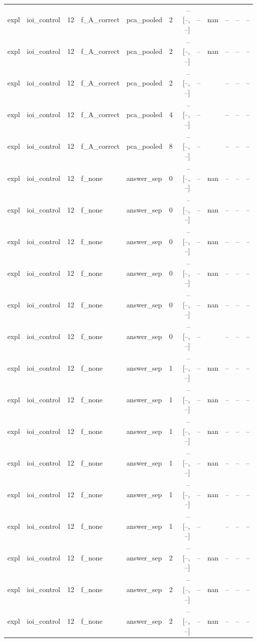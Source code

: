 \begin{tabular}{llrllrrrlrrr}
expl & ioi\_control & 12 & f\_A\_correct & pca\_pooled & 2 & -- [--, --] & -- & nan & -- & -- & -- \\
expl & ioi\_control & 12 & f\_A\_correct & pca\_pooled & 2 & -- [--, --] & -- & nan & -- & -- & -- \\
expl & ioi\_control & 12 & f\_A\_correct & pca\_pooled & 2 & -- [--, --] & -- &  & -- & -- & -- \\
expl & ioi\_control & 12 & f\_A\_correct & pca\_pooled & 4 & -- [--, --] & -- &  & -- & -- & -- \\
expl & ioi\_control & 12 & f\_A\_correct & pca\_pooled & 8 & -- [--, --] & -- &  & -- & -- & -- \\
expl & ioi\_control & 12 & f\_none & answer\_sep & 0 & -- [--, --] & -- & nan & -- & -- & -- \\
expl & ioi\_control & 12 & f\_none & answer\_sep & 0 & -- [--, --] & -- & nan & -- & -- & -- \\
expl & ioi\_control & 12 & f\_none & answer\_sep & 0 & -- [--, --] & -- & nan & -- & -- & -- \\
expl & ioi\_control & 12 & f\_none & answer\_sep & 0 & -- [--, --] & -- & nan & -- & -- & -- \\
expl & ioi\_control & 12 & f\_none & answer\_sep & 0 & -- [--, --] & -- & nan & -- & -- & -- \\
expl & ioi\_control & 12 & f\_none & answer\_sep & 0 & -- [--, --] & -- &  & -- & -- & -- \\
expl & ioi\_control & 12 & f\_none & answer\_sep & 1 & -- [--, --] & -- & nan & -- & -- & -- \\
expl & ioi\_control & 12 & f\_none & answer\_sep & 1 & -- [--, --] & -- & nan & -- & -- & -- \\
expl & ioi\_control & 12 & f\_none & answer\_sep & 1 & -- [--, --] & -- & nan & -- & -- & -- \\
expl & ioi\_control & 12 & f\_none & answer\_sep & 1 & -- [--, --] & -- & nan & -- & -- & -- \\
expl & ioi\_control & 12 & f\_none & answer\_sep & 1 & -- [--, --] & -- & nan & -- & -- & -- \\
expl & ioi\_control & 12 & f\_none & answer\_sep & 1 & -- [--, --] & -- &  & -- & -- & -- \\
expl & ioi\_control & 12 & f\_none & answer\_sep & 2 & -- [--, --] & -- & nan & -- & -- & -- \\
expl & ioi\_control & 12 & f\_none & answer\_sep & 2 & -- [--, --] & -- & nan & -- & -- & -- \\
expl & ioi\_control & 12 & f\_none & answer\_sep & 2 & -- [--, --] & -- & nan & -- & -- & -- \\

\end{tabular}
